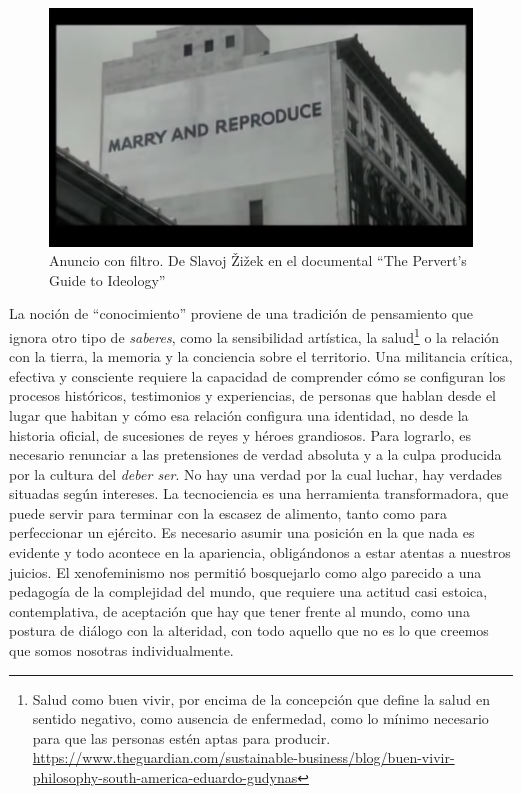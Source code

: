 \begin{figure}[htbp]
	\centering
	\includegraphics[width=.8\linewidth]{images/ideology2.png}
	\caption[Anuncio con filtro.]{Anuncio con filtro. De Slavoj Žižek en el documental \enquote{The Pervert's Guide to Ideology}}
\end{figure}

La noción de \enquote{conocimiento} proviene de una tradición de pensamiento que ignora otro tipo de \emph{saberes}, como la sensibilidad artística, la salud\footnote{Salud como buen vivir, por encima de la concepción que define la salud en sentido negativo, como ausencia de enfermedad, como lo mínimo necesario para que las personas estén aptas para producir. \url{https://www.theguardian.com/sustainable-business/blog/buen-vivir-philosophy-south-america-eduardo-gudynas}} o la relación con la tierra, la memoria y la conciencia sobre el territorio. Una militancia crítica, efectiva y consciente requiere la capacidad de comprender cómo se configuran los procesos históricos, testimonios y experiencias, de personas que hablan desde el lugar que habitan y cómo esa relación configura una identidad, no desde la historia oficial, de sucesiones de reyes y héroes grandiosos. Para lograrlo, es necesario renunciar a las pretensiones de verdad absoluta y a la culpa producida por la cultura del \emph{deber ser}. No hay una verdad por la cual luchar, hay verdades situadas según intereses. La tecnociencia es una herramienta transformadora, que puede servir para terminar con la escasez de alimento, tanto como para perfeccionar un ejército. Es necesario asumir una posición en la que nada es evidente y todo acontece en la apariencia, obligándonos a estar atentas a nuestros juicios. El xenofeminismo nos permitió bosquejarlo como algo parecido a una pedagogía de la complejidad del mundo, que requiere una actitud casi estoica, contemplativa, de aceptación que hay que tener frente al mundo, como una postura de diálogo con la alteridad, con todo aquello que no es lo que creemos que somos nosotras individualmente.

